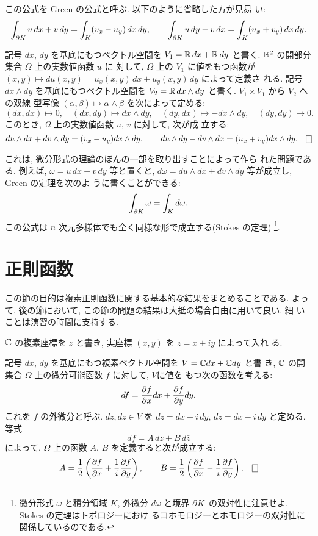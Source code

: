 \documentclass[12pt,twoside]{jarticle}
\begin{document}
\noindent この公式を Green の公式と呼ぶ. 以下のように省略した方が見易
い:
\[
  \int_{\partial K} u \,dx + v \,dy
  =
  \int_K (v_x - u_y)\,dx\,dy,
  \qquad
  \int_{\partial K} u \,dy - v \,dx
  =
  \int_K (u_x + v_y)\,dx\,dy.
\]%

\begin{question}
  記号 $dx$, $dy$ を基底にもつベクトル空間を $V_1 = {\mathbb R}\,dx + {\mathbb R}\,dy$ 
  と書く.  ${\mathbb R}^2$ の開部分集合 $\Omega$ 上の実数値函数 $u$ に
  対して, $\Omega$ 上の $V_1$ に値をもつ函数が %
  $(x,y)\mapsto du(x,y) = u_x(x,y)\,dx + u_y(x,y)\,dy$ によって定義さ
  れる. 記号 $dx\wedge dy$ を基底にもつベクトル空間を %
  $V_2 = {\mathbb R}\,dx\wedge dy$ と書く. $V_1\times V_1$ から $V_2$ への双線
  型写像 $(\alpha,\beta)\mapsto \alpha\wedge\beta$ を次によって定める:
  \[
    (dx,dx) \mapsto 0, \quad
    (dx,dy) \mapsto dx\wedge dy, \quad
    (dy,dx) \mapsto - dx\wedge dy, \quad
    (dy,dy) \mapsto 0.
  \]%
  このとき, $\Omega$ 上の実数値函数 $u$, $v$ に対して, 次が成
  立する:
  \[
    du\wedge dx + dv\wedge dy = (v_x - u_y) dx\wedge dy,
    \qquad
    du\wedge dy - dv\wedge dx = (u_x + v_y) dx\wedge dy. \qed
  \]
\end{question}

\noindent これは, 微分形式の理論のほんの一部を取り出すことによって作ら
れた問題である. 例えば, $\omega=u\,dx+v\,dy$ 等と置くと, %
$d\omega=du \wedge dx + dv\wedge dy$ 等が成立し, Green の定理を次のよ
うに書くことができる:
\[
  \int_{\partial K} \omega = \int_K d\omega.
\]%
この公式は $n$ 次元多様体でも全く同様な形で成立する(Stokes の定理)%
\footnote{微分形式 $\omega$ と積分領域 $K$, 外微分 $d\omega$ と境界 
  $\partial K$ の双対性に注意せよ. Stokes の定理はトポロジーにおけ
  るコホモロジーとホモロジーの双対性に関係しているのである.}.
%


\section{正則函数}

この節の目的は複素正則函数に関する基本的な結果をまとめることである. よっ
て, 後の節において, この節の問題の結果は大抵の場合自由に用いて良い. 細
いことは演習の時間に支持する.

\medskip

${\mathbb C}$ の複素座標を $z$ と書き, 実座標 $(x,y)$ を $z=x+iy$ によって入れ
る.

\begin{question}
  記号 $dx$, $dy$ を基底にもつ複素ベクトル空間を $V={\mathbb C} dx+{\mathbb C} dy$ と書
  き, ${\mathbb C}$ の開集合 $\Omega$ 上の微分可能函数 $f$ に対して, $V$に値を
  もつ次の函数を考える:
  \[
    df = \frac{\partial f}{\partial x}dx + \frac{\partial f}{\partial y}dy.
  \]%
  これを $f$ の外微分と呼ぶ. $dz,d\bar{z}\in V$ を $dz=dx+i\,dy$,
  $d\bar{z}=dx-i\,dy$ と定める. 等式
  \[
    df = A\,dz + B\,d\bar{z}
  \]%
  によって, $\Omega$ 上の函数 $A$, $B$ を定義すると次が成立する:
  \[
    A =
    \frac{1}{2}
    \left(
      \frac{\del f}{\del x} + \frac{1}{i} \frac{\del f}{\del y}
    \right),
    \qquad
    B =
    \frac{1}{2}
    \left(
      \frac{\del f}{\del x} - \frac{1}{i} \frac{\del f}{\del y}
    \right). 
    \qed
  \]%
\end{question}
\end{document}
